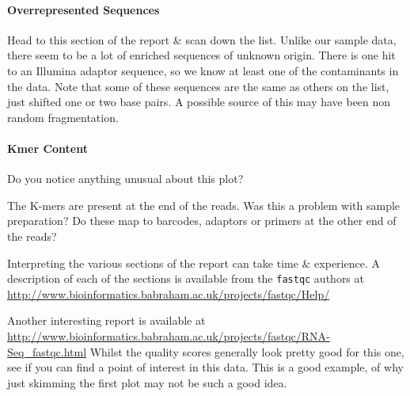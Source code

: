 \paragraph{Overrepresented Sequences}
Head to this section of the report \& scan down the list.
Unlike our sample data, there seem to be a lot of enriched sequences of unknown origin.
There is one hit to an Illumina adaptor sequence, so we know at least one of the contaminants in the data.
Note that some of these sequences are the same as others on the list, just shifted one or two base pairs.
A possible source of this may have been non random fragmentation.

\paragraph{Kmer Content}
\begin{questions}
Do you notice anything unusual about this plot?\\
\begin{answer}
The K-mers are present at the end of the reads.
Was this a problem with sample preparation? 
Do these map to barcodes, adaptors or primers at the other end of the reads? \\
\end{answer}
\end{questions}

\begin{information}
Interpreting the various sections of the report can take time \& experience.
A description of each of the sections is available from the \texttt{fastqc} authors at \url{http://www.bioinformatics.babraham.ac.uk/projects/fastqc/Help/}
\end{information}

\begin{bonus}
Another interesting report is available at \url{http://www.bioinformatics.babraham.ac.uk/projects/fastqc/RNA-Seq\_fastqc.html}
Whilst the quality scores generally look pretty good for this one, see if you can find a point of interest in this data.
This is a good example, of why just skimming the first plot may not be such a good idea.
\end{bonus}

